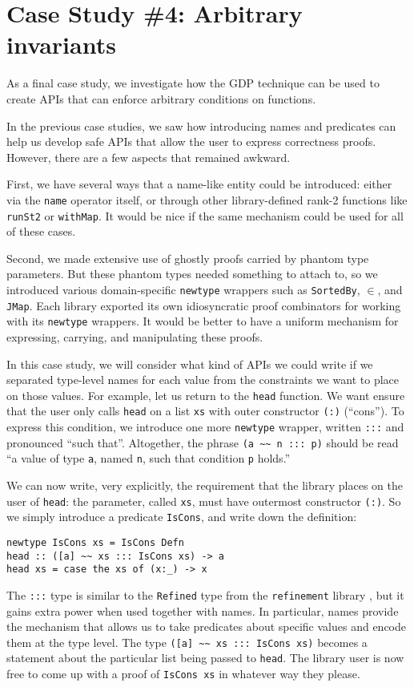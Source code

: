 \documentclass[format=sigplan, review=false, screen=true]{acmart}
\begin{document}
\section{Case Study \#4: Arbitrary invariants}

As a final case study, we investigate how the GDP technique can be used to
create APIs that can enforce arbitrary conditions on functions.

In the previous case studies, we saw how introducing names and predicates can
help us develop safe APIs that allow the user to express correctness proofs.
However, there are a few aspects that remained awkward.

First, we have several
ways that a name-like entity could be introduced: either via the \texttt{name} operator
itself, or through other library-defined rank-2 functions like \texttt{runSt2} or \texttt{withMap}.
It would be nice if the same mechanism could be used for all of these cases.

Second, we made extensive use of ghostly proofs carried by phantom type parameters. But these
phantom types needed something to attach to, so we introduced various domain-specific \texttt{newtype}
wrappers such as \texttt{SortedBy}, \texttt{$\in$}, and \texttt{JMap}. Each library exported its own
idiosyncratic proof combinators for working with its \texttt{newtype} wrappers. It would be better to have
a uniform mechanism for expressing, carrying, and manipulating these proofs.

In this case study, we will consider what kind of APIs we could write if we separated
type-level names for each value from the constraints we want to place on those values.
For example, let us return to the \texttt{head} function. We want ensure that the
user only calls \texttt{head} on a list \texttt{xs} with outer constructor \texttt{(:)} (``cons'').
To express this condition, we introduce one more \texttt{newtype} wrapper,
written \texttt{:::} and pronounced ``such that''. Altogether, the phrase 
\verb|(a ~~ n ::: p)| should be read ``a value of type \texttt{a}, named \texttt{n}, such
that condition \texttt{p} holds.''


We can now write, very explicitly, the requirement that the library places on the user
of \texttt{head}: the parameter, called \texttt{xs}, must have outermost constructor
\texttt{(:)}. So we simply introduce a predicate \texttt{IsCons}, and write down the definition:
\begin{verbatim}
newtype IsCons xs = IsCons Defn
head :: ([a] ~~ xs ::: IsCons xs) -> a
head xs = case the xs of (x:_) -> x
\end{verbatim}
The \texttt{:::} type is similar to the \texttt{Refined} type from the \texttt{refinement} library \cite{refined},
but it gains extra power when used together with names.
In particular, names provide the mechanism that allows us to take predicates about specific values and
encode them at the type level.
The type \verb|([a] ~~ xs ::: IsCons xs)| becomes a statement about the particular list being passed to \texttt{head}.
The library user is now free to come up with a proof of \texttt{IsCons xs} in whatever way they please.
\end{document}
